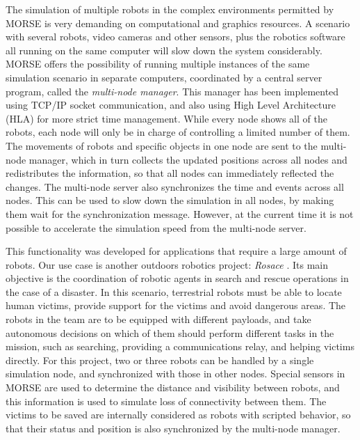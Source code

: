 \documentclass{llncs}
\newcommand{\serge}[1]{\nb{Serge}{blue}{#1}}
\newcommand{\gilberto}[1]{\nb{Gilberto}{red}{#1}}
\begin{document}
The simulation of multiple robots in the complex environments permitted by
MORSE is very demanding on computational and graphics resources.
A scenario with several robots, video cameras and
other sensors, plus the robotics software all running on the same computer will
slow down the system considerably. MORSE offers the possibility of running
multiple instances of the same simulation scenario in separate computers,
coordinated by a central server program, called the \emph{multi-node
manager}. This manager has been implemented using TCP/IP socket communication,
and also using High Level Architecture (HLA) \cite{Kuhl:1999:CCS:318931} for
more strict time management.
While every node shows all of the robots, each node will only
be in charge of controlling a limited number of them. The movements
of robots and specific objects in one node are sent to the multi-node
manager, which in turn collects the updated positions across all nodes
and redistributes the information, so that all nodes can immediately
reflected the changes. The multi-node server also 
synchronizes the time and events across all nodes. This can be used
to slow down the simulation in all nodes, by making them wait for the
synchronization message. However, at the current time it is not possible to
accelerate the simulation speed from the multi-node server.

This functionality was developed for applications that require a large amount
of robots. Our use case is another outdoors robotics project: \emph{Rosace}
\cite{springerlink:10.1007/978-3-642-12384-9_18,springerlink:10.1007/978-3-642-28786-2_32}.
Its main objective is the coordination of robotic agents in search and rescue
operations in the case of a disaster. In this scenario, terrestrial robots must
be able to locate human victims, provide support for the victims and avoid
dangerous areas. The robots in the team are to be equipped with different
payloads, and take autonomous decisions on which of them should perform
different tasks in the mission, such as searching, providing a communications
relay, and helping victims directly.
For this project, two or three robots can be handled by a single simulation
node, and synchronized with those in other nodes.  Special sensors in MORSE are
used to determine the distance and visibility between robots, and this
information is used to simulate loss of connectivity between them.
The victims to be saved are internally considered as robots with scripted
behavior, so that their status and position is also synchronized by the
multi-node manager.
\end{document}
